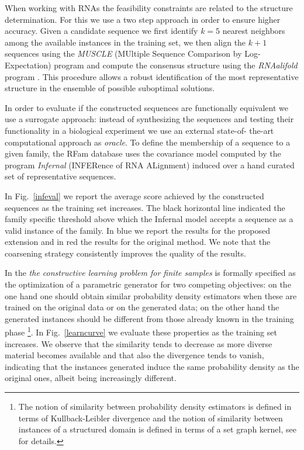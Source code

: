 \documentclass{article}
\begin{document}
When working with RNAs the feasibility constraints are related to the
structure determination. For this we use a two step approach in order to
ensure higher accuracy. Given a candidate sequence we first identify $k=5$
nearest neighbors among the available instances in the training set, we then
align the $k+1$ sequences using the \emph{MUSCLE} (MUltiple Sequence
Comparison by Log- Expectation) program \citep{muscle} and compute the
consensus structure using the \emph{RNAalifold} program \citep{rnaalifold}.
This procedure allows a robust identification of the most representative
structure in the ensemble of possible suboptimal solutions.

In order to evaluate if the constructed sequences are functionally equivalent
we use a surrogate approach: instead of synthesizing the sequences and testing
their functionality in a biological experiment we use an external state-of-
the-art computational approach as {\em oracle}. To define the membership of a
sequence to a given family, the RFam database uses the covariance model
computed by the program \emph{Infernal} (INFERence of RNA ALignment)
\citep{infernal} induced over a hand curated set of representative sequences.

In Fig.~\ref{infeval} we report the average score achieved by the constructed
sequences as the training set increases. The black horizontal line indicated
the family specific threshold above which the Infernal model accepts a
sequence as a valid instance of the family. In blue we report the results for
the proposed extension and in red the results for the original method. We note
that the coarsening strategy consistently improves the quality of the results.

In \cite{costa16} the \emph{the constructive learning problem for finite
samples} is formally specified as the optimization of a parametric generator
for two competing objectives: on the one hand one should obtain similar
probability density estimators when these are trained on the original data or
on the generated data; on the other hand the generated instances should be
different from those already known in the training phase \footnote{The notion
of similarity between probability density estimators is defined in terms of
Kullback-Leibler divergence and the notion of similarity between instances of
a structured domain is defined in terms of a set graph kernel, see
\citep{costa16} for details.}. In Fig.~\ref{learncurve} we evaluate these
properties as the training set increases. We observe that the similarity tends
to decrease as more diverse material becomes available and that also the
divergence tends to vanish, indicating that the instances generated induce the
same probability density as the original ones, albeit being increasingly
different.
\end{document}
